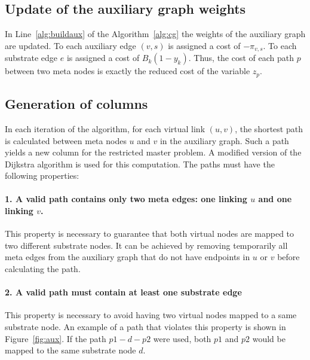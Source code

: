 \documentclass[12pt]{article}
\begin{document}
\subsection{Update of the auxiliary graph weights}\label{sec:update}
In Line~\ref{alg:buildaux} of the Algorithm~\ref{alg:cg} the weights of the auxiliary graph are updated.
To each auxiliary edge $(v,s)$ is assigned a cost of $-\pi_{v,s}$. 
To each substrate edge $e$ is assigned a cost of $B_{k}(1 - y_{k})$. 
Thus, the cost of each path $p$ between two meta nodes is exactly the reduced cost of the variable $z_{p}$.


\subsection{Generation of columns}
In each iteration of the algorithm, for each virtual link $(u,v)$, the shortest path is calculated between meta nodes $u$ and $v$ in the auxiliary graph.
Such a path yields a new column for the restricted master problem. 
A modified version of the Dijkstra algorithm is used for this computation. 
The paths must have the following properties:

\paragraph{1. A valid path contains only two meta edges: one linking $u$ and one linking $v$.}
This property is necessary to guarantee that both virtual nodes are mapped to two different substrate nodes. 
It can be achieved by removing temporarily all meta edges from the auxiliary graph that do not have endpoints in $u$ or $v$ before calculating the path. 

\paragraph{2. A valid path must contain at least one substrate edge}
This property is necessary to avoid having two virtual nodes mapped to a same substrate node.
An example of a path that violates this property is shown in Figure~\ref{fig:aux}. 
If the path $p1-d-p2$ were used, both $p1$ and $p2$ would be mapped to the same substrate node $d$. 
\end{document}
